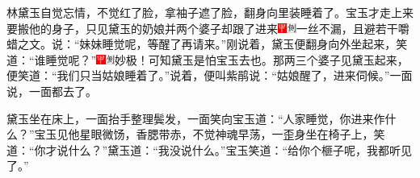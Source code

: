 林黛玉自觉忘情，不觉红了脸，拿袖子遮了脸，翻身向里装睡着了。宝玉才走上来要搬他的身子，只见黛玉的奶娘并两个婆子却跟了进来{\includegraphics[width=3mm]{../Images/00002}\includegraphics[width=3mm]{../Images/00011}\footnotesize \kaishu 一丝不漏，且避若干嚼蜡之文。}说：``妹妹睡觉呢，等醒了再请来。''刚说着，黛玉便翻身向外坐起来，笑道：``谁睡觉呢？''{\includegraphics[width=3mm]{../Images/00002}\includegraphics[width=3mm]{../Images/00011}\footnotesize \kaishu 妙极！可知黛玉是怕宝玉去也。}那两三个婆子见黛玉起来，便笑道：``我们只当姑娘睡着了。''说着，便叫紫鹃说：``姑娘醒了，进来伺候。''一面说，一面都去了。

黛玉坐在床上，一面抬手整理鬓发，一面笑向宝玉道：``人家睡觉，你进来作什么？''宝玉见他星眼微饧，香腮带赤，不觉神魂早荡，一歪身坐在椅子上，笑道：``你才说什么？''黛玉道：``我没说什么。''宝玉笑道：``给你个榧子呢，我都听见了。''

